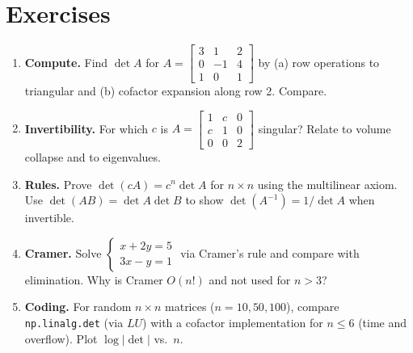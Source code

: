 \section{Exercises}
\label{sec:ch07-exercises}
\begin{enumerate}[label=E7.\arabic*, leftmargin=*, itemsep=0.8em]
\item \textbf{Compute.} Find $\det A$ for $A=\begin{bmatrix}3&1&2\\0&-1&4\\1&0&1\end{bmatrix}$ by (a) row operations to triangular and (b) cofactor expansion along row 2. Compare.
\item \textbf{Invertibility.} For which $c$ is $A=\begin{bmatrix}1&c&0\\c&1&0\\0&0&2\end{bmatrix}$ singular? Relate to volume collapse and to eigenvalues.
\item \textbf{Rules.} Prove $\det(cA)=c^n\det A$ for $n\times n$ using the multilinear axiom. Use $\det(AB)=\det A\det B$ to show $\det(A^{-1})=1/\det A$ when invertible.
\item \textbf{Cramer.} Solve $\begin{cases}x+2y=5\\3x-y=1\end{cases}$ via Cramer's rule and compare with elimination. Why is Cramer $O(n!)$ and not used for $n>3$?
\item \textbf{Coding.} For random $n\times n$ matrices ($n=10,50,100$), compare \texttt{np.linalg.det} (via $LU$) with a cofactor implementation for $n\le6$ (time and overflow). Plot $\log|\det|$ vs.\ $n$.
\end{enumerate}
